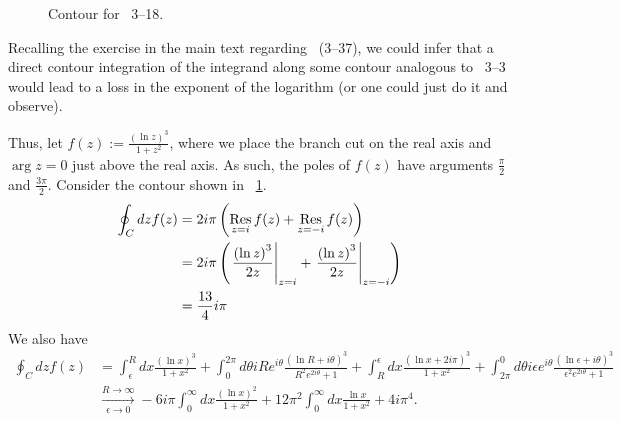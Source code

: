 \item

\begin{figure}[h]
	\centering
	\caption{Contour for ~3--18.}%
	\label{fig:problem3-18}
\end{figure}

Recalling the exercise in the main text regarding ~(3--37),
we could infer that a direct contour integration of the integrand along some contour analogous to ~3--3
would lead to a loss in the exponent of the logarithm (or one could just do it and observe).

Thus, let $f(z) := \frac{{\left( \ln z \right)}^3}{1 + z^2}$,
where we place the branch cut on the real axis and $\arg z = 0$ just above the real axis.
As such, the poles of $f(z)$ have arguments $\frac{\pi}{2}$ and $\frac{3\pi}{2}$.
Consider the contour shown in ~\ref{fig:problem3-18}.
\begin{align*}
	\oint_C dz f(z)
	&= 2i\pi \left( \mathop{\mathrm{Res}}_{z=i} f(z) + \mathop{\mathrm{Res}}_{z=-i} f(z) \right) \\
	&= 2i\pi \left( {\left. \frac{{\left( \ln z \right)}^3}{2z} \right|}_{z=i} + {\left. \frac{{\left( \ln z \right)}^3}{2z} \right|}_{z=-i} \right) \\
	&= \frac{13}{4}i\pi
\end{align*}
We also have
\begin{align*}
    \oint_C dz f(z)
    &= \int_\epsilon^R dx \frac{{\left( \ln x \right)}^3}{1 +x^2}
     + \int_0^{2\pi} d\theta iRe^{i\theta} \frac{{\left( \ln R + i\theta\right)}^3}{R^2 e^{2i\theta} + 1}
     + \int_R^\epsilon dx \frac{{\left( \ln x + 2i\pi \right)}^3}{1 + x^2}
     + \int_{2\pi}^0 d\theta i\epsilon e^{i\theta} \frac{{\left(\ln\epsilon + i\theta\right)}^3}{\epsilon^2 e^{2i\theta} + 1} \\
    &\xrightarrow[\epsilon \rightarrow 0]{R \rightarrow \infty}
        -6i\pi \int_0^\infty dx \frac{{\left( \ln x \right)}^2}{1 + x^2}
	+ 12\pi^2 \int_0^\infty dx \frac{\ln x}{1 + x^2}
	+ 4i\pi^4.
\end{align*}


